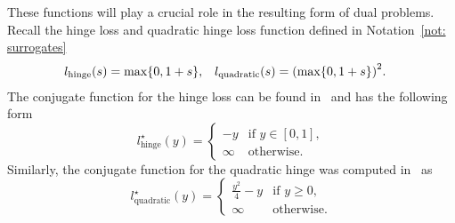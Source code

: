 These functions will play a crucial role in the resulting form of dual problems. Recall the hinge loss and quadratic hinge loss function defined in Notation~\ref{not: surrogates}
\begin{align*}
    l_{\text{hinge}}(s) & = \max\Brac[c]{0, 1 + s}, &
    l_{\text{quadratic}}(s) & = \Brac{\max\Brac[c]{0, 1 + s}}^2.
\end{align*}
The conjugate function for the hinge loss can be found in~\cite{shnlev2014accelerated} and has the following form
\begin{equation}\label{eq: conjugate hinge}
  l_{\text{hinge}}^{\star}(y) =
  \begin{cases}
    -y & \text{if } y \in [0, 1], \\
    \infty & \text{otherwise.}
  \end{cases}  
\end{equation}
Similarly, the conjugate function for the quadratic hinge was computed in~\cite{kanamori2013conjugate} as
\begin{equation}\label{eq: conjugate quadratic hinge}
  l_{\text{quadratic}}^{\star}(y) =
  \begin{cases}
    \frac{y^2}{4} - y & \text{if } y \geq 0, \\
    \infty & \text{otherwise.}
  \end{cases}
\end{equation}

